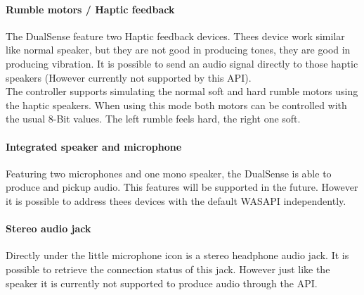 \paragraph{Rumble motors / Haptic feedback}
The DualSense feature two Haptic feedback devices. Thees device work similar like normal speaker, but they are not good in producing tones, they are good in producing vibration. It is possible to send an audio signal directly to those haptic speakers (However currently not supported by this API).\\
The controller supports simulating the normal soft and hard rumble motors using the haptic speakers. When using this mode both motors can be controlled with the usual 8-Bit values. The left rumble feels hard, the right one soft.

\paragraph{Integrated speaker and microphone}
Featuring two microphones and one mono speaker, the DualSense is able to produce and pickup audio. This features will be supported in the future. However it is possible to address thees devices with the default WASAPI independently. 

\paragraph{Stereo audio jack}
Directly under the little microphone icon is a stereo headphone audio jack. It is possible to retrieve the connection status of this jack. However just like the speaker it is currently not supported to produce audio through the API.

\newpage